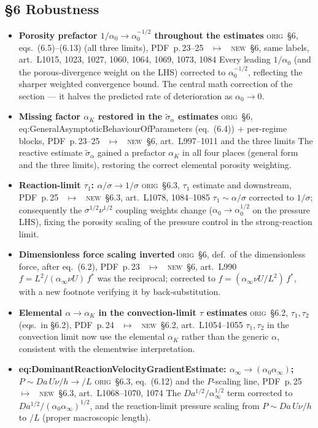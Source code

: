 \documentclass[11pt]{article}
\newcommand{\Orig}{\textcolor{origc}{\footnotesize\textsc{orig}}}
\newcommand{\New}{\textcolor{newc}{\footnotesize\textsc{new}}}
\newcommand{\code}[1]{\textcolor{newc}{\ttfamily\small #1}}
\newcommand{\pdfp}[1]{PDF~p.\,#1}
\newcommand{\artl}[1]{art.\ L#1}       %
\newcommand{\ch}[4]{%
  \item \textbf{#1}\newline
    {\footnotesize\Orig\ #2 \ \textcolor{locc}{$\longmapsto$} \ \New\ #3}\newline
    #4}
\begin{document}
\subsection{\S6 Robustness}
\begin{itemize}
\ch{Porosity prefactor $1/\alpha_0 \to \alpha_0^{-1/2}$ throughout the estimates}
   {\S6, eqs.~(6.5)--(6.13) (all three limits), \pdfp{23}--25}
   {\S6, same labels, \artl{1015}, 1023, 1027, 1060, 1064, 1069, 1073, 1084}
   {Every leading $1/\alpha_0$ (and the porous-divergence weight on the LHS) corrected to
    $\alpha_0^{-1/2}$, reflecting the sharper weighted convergence bound. The central math correction
    of the section --- it halves the predicted rate of deterioration as $\alpha_0\to0$.}
\ch{Missing factor $\alpha_K$ restored in the $\tilde\sigma_\alpha$ estimates}
   {\S6, \code{eq:GeneralAsymptoticBehaviourOfParameters} (eq.~(6.4)) + per-regime blocks, \pdfp{23}--25}
   {\S6, \artl{997}--1011 and the three limits}
   {The reactive estimate $\tilde\sigma_\alpha$ gained a prefactor $\alpha_K$ in all four places
    (general form and the three limits), restoring the correct elemental porosity weighting.}
\ch{Reaction-limit $\tau_1$: $\alpha/\sigma \to 1/\sigma$}
   {\S6.3, $\tau_1$ estimate and downstream, \pdfp{25}}
   {\S6.3, \artl{1078}, 1084--1085}
   {$\tau_1\!\sim\!\alpha/\sigma$ corrected to $1/\sigma$; consequently the $\sigma^{1/2}\nu^{1/2}$
    coupling weights change ($\alpha_0\to\alpha_0^{1/2}$ on the pressure LHS), fixing the porosity
    scaling of the pressure control in the strong-reaction limit.}
\ch{Dimensionless force scaling inverted}
   {\S6, def.\ of the dimensionless force, after eq.~(6.2), \pdfp{23}}
   {\S6, \artl{990}}
   {$f=L^2/(\alpha_\infty\nu U)\,f^*$ was the reciprocal; corrected to
    $f=(\alpha_\infty\nu U/L^2)\,f^*$, with a new footnote verifying it by back-substitution.}
\ch{Elemental $\alpha\to\alpha_K$ in the convection-limit $\tau$ estimates}
   {\S6.2, $\tau_1,\tau_2$ (eqs.\ in \S6.2), \pdfp{24}}
   {\S6.2, \artl{1054}--1055}
   {$\tau_1,\tau_2$ in the convection limit now use the elemental $\alpha_K$ rather than the generic
    $\alpha$, consistent with the elementwise interpretation.}
\ch{\code{eq:DominantReactionVelocityGradientEstimate}: $\alpha_\infty\!\to\!(\alpha_0\alpha_\infty)$; $P\!\sim\!Da\,U\nu/h\!\to\!/L$}
   {\S6.3, eq.~(6.12) and the $P$-scaling line, \pdfp{25}}
   {\S6.3, \artl{1068}--1070, 1074}
   {The $Da^{1/2}/\alpha_\infty^{1/2}$ term corrected to $Da^{1/2}/(\alpha_0\alpha_\infty)^{1/2}$, and
    the reaction-limit pressure scaling from $P\!\sim\!Da\,U\nu/h$ to $/L$ (proper macroscopic length).}

\end{itemize}
\end{document}
